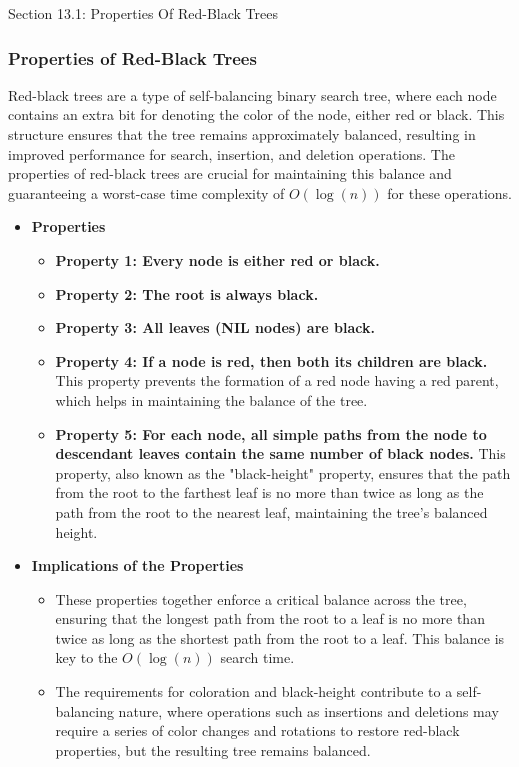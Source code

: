 \begin{notes}{Section 13.1: Properties Of Red-Black Trees}
    \subsubsection*{Properties of Red-Black Trees}

    Red-black trees are a type of self-balancing binary search tree, where each node contains an extra bit for denoting the color of the node, either red or black. This structure ensures that the tree 
    remains approximately balanced, resulting in improved performance for search, insertion, and deletion operations. The properties of red-black trees are crucial for maintaining this balance and 
    guaranteeing a worst-case time complexity of $O(\log{(n)})$ for these operations.
    
    \begin{itemize}
        \item \textbf{Properties}
        \begin{itemize}
            \item \textbf{Property 1: Every node is either red or black.}
            \item \textbf{Property 2: The root is always black.}
            \item \textbf{Property 3: All leaves (NIL nodes) are black.}
            \item \textbf{Property 4: If a node is red, then both its children are black.} This property prevents the formation of a red node having a red parent, which helps in maintaining the balance 
            of the tree.
            \item \textbf{Property 5: For each node, all simple paths from the node to descendant leaves contain the same number of black nodes.} This property, also known as the "black-height" property, 
            ensures that the path from the root to the farthest leaf is no more than twice as long as the path from the root to the nearest leaf, maintaining the tree's balanced height.
        \end{itemize}
        
        \item \textbf{Implications of the Properties}
        \begin{itemize}
            \item These properties together enforce a critical balance across the tree, ensuring that the longest path from the root to a leaf is no more than twice as long as the shortest path from 
            the root to a leaf. This balance is key to the $O(\log{(n)})$ search time.
            \item The requirements for coloration and black-height contribute to a self-balancing nature, where operations such as insertions and deletions may require a series of color changes and 
            rotations to restore red-black properties, but the resulting tree remains balanced.
        \end{itemize}
        

\end{itemize}
\end{notes}

